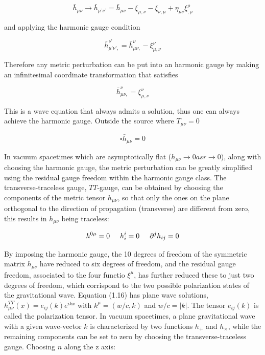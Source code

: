 \documentclass[binding=0.6cm, LaM]{sapthesis}
\begin{document}
		\begin{equation}
		{\bar h}_{\mu\nu} \rightarrow {\bar h}_{\mu’\nu’}  = {\bar h}_{\mu\nu}  - \xi_{\mu,\nu} -\xi_{\nu,\mu} + \eta_{\mu\nu}\xi^{\rho}_{,\rho}
		\end{equation}

	and applying the harmonic gauge condition

		\begin{equation}
		{\bar h}_{\mu’\nu’,} ^{\nu’} = {\bar h}_{\mu\nu,} ^{\nu} - \xi_{\mu,\nu}^{\nu}
		\end{equation}

	Therefore any metric perturbation can be put into an harmonic gauge by making an infinitesimal 
	coordinate transformation that satisfies

		\begin{equation}
		{\bar h}_{\mu\nu,} ^{\nu} = \xi_{\mu,\nu}^{\nu}
		\end{equation}

	This is a wave equation that always admits a solution, thus one can always achieve the harmonic gauge.
	Outside the source where $T_{\mu\nu} = 0$

		\begin{equation}
		\square {\bar h}_{\mu\nu} = 0
		\end{equation}

	In vacuum spacetimes which are asymptotically flat ($h_{\mu\nu} \rightarrow 0 as r \rightarrow 0$), 
	along with choosing the harmonic gauge, the metric perturbation can be greatly simplified using
	the residual gauge freedom within the harmonic gauge class. The transverse-traceless gauge,  
	$TT$-gauge, can be obtained by choosing the components of the metric tensor $h_{\mu\nu}$,
	so that only the ones on the plane orthogonal to the direction of propagation (transverse) 
	are different from zero, this results in $h_{\mu\nu}$ being traceless:

		\begin{equation}
		h^{0\mu} = 0 \hspace*{0.5cm}  h^{i}_i = 0  \hspace*{0.5cm}   {\partial}^jh_{ij} = 0
		\end{equation}

	By imposing the harmonic gauge, the 10 degrees of freedom of the symmetric matrix $h_{\mu\nu}$ 
	have reduced to six degrees of freedom, and the residual gauge freedom,
	associated to the four functio $\xi^{\mu}$, has further reduced these to just two degrees of freedom, 
	which corrispond to the two possible polarization states of the gravitational wave.
	Equation (1.16) has plane wave solutions, $h_{\mu\nu}^{TT}(x)=e_{ij}(k)e^{ikx}$ with 
	$k^{\mu}=(w/c,k)$ and $w/c=|k|$. The tensor $e_{ij}(k)$ is called the polarization tensor.
	In vacuum spacetimes, a plane gravitational wave with a given wave-vector $k$ is characterized 
	by two functions $h_+$ and $h_{\times}$, while the remaining components can be set to zero by
	choosing the transverse-traceless gauge. Choosing $n$ along the z axis:
\end{document}
